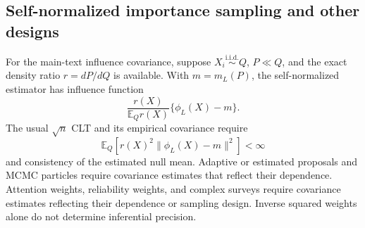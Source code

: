 \documentclass[twoside]{article}
\theoremstyle{definition}
\theoremstyle{remark}
\newcommand{\E}{\mathbb E}
\begin{document}
\subsection{Self-normalized importance sampling and other designs}

For the main-text influence covariance, suppose $X_i\overset{\mathrm{i.i.d.}}\sim Q$, $P\ll Q$, and the exact density ratio $r=dP/dQ$ is available. With $m=m_L(P)$, the self-normalized estimator has influence function
\[
 \frac{r(X)}{\E_Qr(X)}\{\phi_L(X)-m\}.
\]
The usual $\sqrt n$ CLT and its empirical covariance require
\[
 \E_Q\!\left[r(X)^2\|\phi_L(X)-m\|^2\right]<\infty
\]
and consistency of the estimated null mean. Adaptive or estimated proposals and MCMC particles require covariance estimates that reflect their dependence. Attention weights, reliability weights, and complex surveys require covariance estimates reflecting their dependence or sampling design. Inverse squared weights alone do not determine inferential precision.
\end{document}
